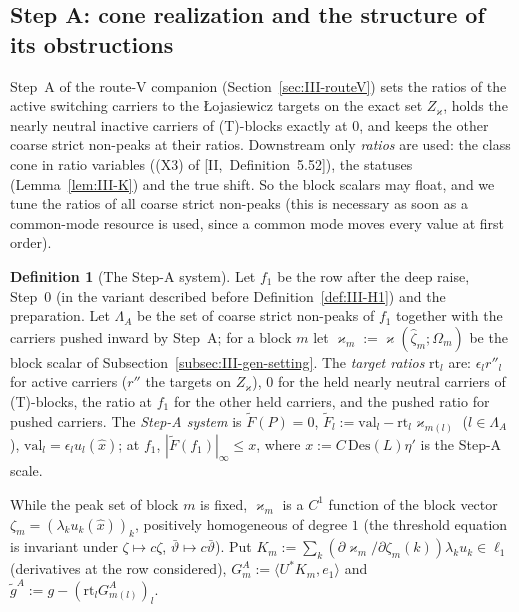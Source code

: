 \documentclass[10pt]{amsart}
\theoremstyle{definition}
\newtheorem{definition}[theorem]{Definition}
\theoremstyle{remark}
\newcommand{\ip}[2]{\langle #1,#2\rangle}
\begin{document}
\subsection{Step A: cone realization and the structure of its obstructions}
\label{subsec:III-SysA}

Step~A of the route-V companion (Section~\ref{sec:III-routeV}) sets the ratios
of the active switching carriers to the \L ojasiewicz targets on the exact set
$Z_\varkappa$, holds the nearly neutral inactive carriers of (T)-blocks
exactly at $0$, and keeps the other coarse strict non-peaks at their ratios.
Downstream only \emph{ratios} are used: the class cone in ratio variables
((X3) of [II,~Definition~5.52]), the statuses (Lemma~\ref{lem:III-K}) and the
true shift.  So the block scalars may float, and we tune the ratios of all
coarse strict non-peaks (this is necessary as soon as a common-mode resource
is used, since a common mode moves every value at first order).

\begin{definition}[The Step-A system]\label{def:III-SysA}
Let $f_1$ be the row after the deep raise, Step~0 (in the variant described
before Definition~\ref{def:III-H1}) and the preparation.  Let
$\Lambda_A$ be the set of coarse strict non-peaks of $f_1$ together with the
carriers pushed inward by Step~A; for a block $m$ let $\varkappa_m:=
\varkappa(\hat\zeta_m;\Omega_m)$ be the block scalar of
Subsection~\ref{subsec:III-gen-setting}.  The \emph{target ratios}
$\mathrm{rt}_l$ are: $\epsilon_lr''_l$ for active carriers ($r''$ the targets
on $Z_\varkappa$), $0$ for the held nearly neutral carriers of (T)-blocks, the
ratio at $f_1$ for the other held carriers, and the pushed ratio for pushed
carriers.  The \emph{Step-A system} is $\tilde F(P)=0$,
$\tilde F_l:=\mathrm{val}_l-\mathrm{rt}_l\varkappa_{m(l)}$ ($l\in\Lambda_A$),
$\mathrm{val}_l=\epsilon_lu_l(\hat x)$; at $f_1$, $|\tilde F(f_1)|_\infty\le x$,
where $x:=C\,\mathrm{Des}(L)\eta'$ is the Step-A scale.
\end{definition}

While the peak set of block $m$ is fixed, $\varkappa_m$ is a $C^1$ function of
the block vector $\zeta_m=(\lambda_ku_k(\hat x))_k$, positively homogeneous of
degree $1$ (the threshold equation is invariant under $\zeta\mapsto c\zeta$,
$\bar\vartheta\mapsto c\bar\vartheta$).  Put $K_m:=\sum_k(\partial\varkappa_m/
\partial\zeta_m(k))\lambda_ku_k\in\ell_1$ (derivatives at the row considered),
$G^A_m:=\ip{U^*K_m}{e_1}$ and $\tilde g^A:=g-(\mathrm{rt}_lG^A_{m(l)})_{l}$.
\end{document}
